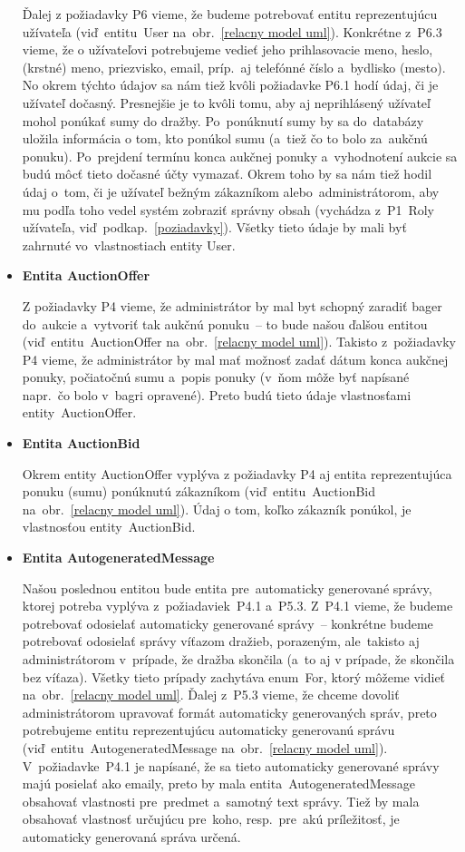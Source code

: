 \begin{itemize}
Ďalej z požiadavky P6 vieme, že budeme potrebovať entitu reprezentujúcu užívateľa (viď~entitu~User na~obr.~\ref{relacny model uml}). Konkrétne z~P6.3 vieme, že o užívateľovi potrebujeme vedieť jeho prihlasovacie meno, heslo, (krstné) meno, priezvisko, email, príp.~aj telefónné číslo a~bydlisko (mesto). No okrem týchto údajov sa nám tiež kvôli požiadavke P6.1 hodí údaj, či je užívateľ dočasný. Presnejšie je to kvôli tomu, aby aj neprihlásený užívateľ mohol ponúkať sumy do dražby. Po~ponúknutí sumy by sa do~databázy uložila informácia o tom, kto ponúkol sumu (a~tiež čo to bolo za~aukčnú ponuku). Po~prejdení termínu konca aukčnej ponuky a~vyhodnotení aukcie sa budú môcť tieto dočasné účty vymazať. Okrem toho by sa nám tiež hodil údaj o~tom, či je užívateľ bežným zákazníkom alebo~administrátorom, aby mu podľa toho vedel systém zobraziť správny obsah (vychádza z~P1~Roly užívateľa, viď~podkap.~\ref{poziadavky}). Všetky tieto údaje by mali byť zahrnuté vo~vlastnostiach entity User.

\item \textbf{Entita AuctionOffer}

Z požiadavky P4 vieme, že administrátor by mal byt schopný zaradiť bager do~aukcie a~vytvoriť tak aukčnú ponuku~-- to bude našou ďalšou entitou (viď~entitu~AuctionOffer na~obr.~\ref{relacny model uml}). Takisto z~požiadavky P4 vieme, že administrátor by mal mať možnosť zadať dátum konca aukčnej ponuky, počiatočnú sumu a~popis ponuky (v~ňom môže byť napísané napr.~čo bolo v~bagri opravené). Preto budú tieto údaje vlastnosťami entity~AuctionOffer.

\item \textbf{Entita AuctionBid}

Okrem entity AuctionOffer vyplýva z požiadavky P4 aj entita reprezentujúca ponuku (sumu) ponúknutú zákazníkom (viď~entitu~AuctionBid na~obr.~\ref{relacny model uml}). Údaj o tom, koľko zákazník ponúkol, je vlastnosťou entity~AuctionBid.

\item \textbf{Entita AutogeneratedMessage}

Našou poslednou entitou bude entita pre~automaticky generované správy, ktorej potreba vyplýva z~požiadaviek~P4.1 a~P5.3. Z~P4.1 vieme, že budeme potrebovať odosielať automaticky generované správy~-- konkrétne budeme potrebovať odosielať správy víťazom dražieb, porazeným, ale~takisto aj administrátorom v~prípade, že dražba skončila (a~to aj v prípade, že skončila bez víťaza). Všetky tieto prípady zachytáva enum~For, ktorý môžeme vidieť na~obr.~\ref{relacny model uml}. Ďalej z~P5.3 vieme, že chceme dovoliť administrátorom upravovať formát automaticky generovaných správ, preto potrebujeme entitu reprezentujúcu automaticky generovanú správu (viď~entitu~AutogeneratedMessage na~obr.~\ref{relacny model uml}). V~požiadavke~P4.1 je napísané, že sa tieto automaticky generované správy majú posielať ako emaily, preto by mala entita~AutogeneratedMessage obsahovať vlastnosti pre~predmet a~samotný text správy. Tiež by mala obsahovať vlastnosť určujúcu pre~koho, resp.~pre~akú príležitosť, je automaticky generovaná správa určená.

\end{itemize}

